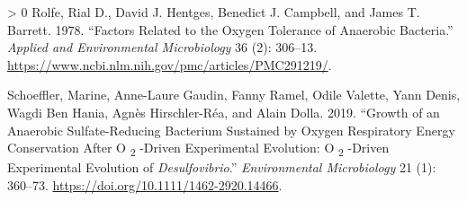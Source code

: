 \documentclass{article}
\newlength{\cslhangindent}
\newenvironment{CSLReferences}[3] %
 {%
  \setlength{\parindent}{0pt}
  \ifodd #1 \everypar{\setlength{\hangindent}{\cslhangindent}}\ignorespaces\fi
  \ifnum #2 > 0
  \setlength{\parskip}{#2\baselineskip}
  \fi
 }%
 {}
\begin{document}
\begin{CSLReferences}{1}{0}
\leavevmode\hypertarget{ref-rolfe1978}{}%
Rolfe, Rial D., David J. Hentges, Benedict J. Campbell, and James T.
Barrett. 1978. {``Factors Related to the Oxygen Tolerance of Anaerobic
Bacteria.''} \emph{Applied and Environmental Microbiology} 36 (2):
306--13. \url{https://www.ncbi.nlm.nih.gov/pmc/articles/PMC291219/}.

\leavevmode\hypertarget{ref-schoeffler2019}{}%
Schoeffler, Marine, Anne-Laure Gaudin, Fanny Ramel, Odile Valette, Yann
Denis, Wagdi Ben Hania, Agnès Hirschler-Réa, and Alain Dolla. 2019.
{``Growth of an Anaerobic Sulfate-Reducing Bacterium Sustained by Oxygen
Respiratory Energy Conservation After O {\textsubscript{2}} -Driven
Experimental Evolution: O {\textsubscript{2}} -Driven Experimental
Evolution of {\emph{Desulfovibrio}}.''} \emph{Environmental
Microbiology} 21 (1): 360--73.
\url{https://doi.org/10.1111/1462-2920.14466}.

\end{CSLReferences}



\end{document}
